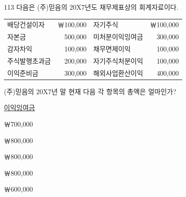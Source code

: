 \begin{question}{113}
다음은 (주)믿음의 20X7년도 재무제표상의 회계자료이다.

{\small\centering
\begin{tabular}{|lrlr|}
\hline
배당건설이자 & ￦100,000 & 자기주식 & ￦100,000 \\
자본금 & 500,000 & 미처분이익잉여금 & 300,000 \\
감자차익 & 100,000 & 채무면제이익 & 100,000 \\
주식발행초과금 & 200,000 & 자기주식처분이익 & 100,000 \\
이익준비금 & 300,000 & 해외사업환산이익 & 400,000 \\
\hline
\end{tabular}\par}

(주)믿음의 20X7년 말 현재 다음 각 항목의 총액은 얼마인가?

\noindent\hspace*{2em}\uline{이익잉여금}\par
\begin{choices}
  \item {}￦700,000
  \item {}￦800,000
  \item {}￦800,000
  \item {}￦800,000
  \item {}￦600,000
\end{choices}
\end{question}
